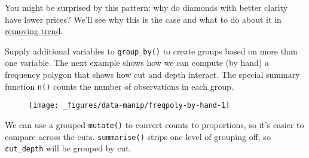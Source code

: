 You might be surprised by this pattern: why do diamonds with better
clarity have lower prices? We'll see why this is the case and what to do
about it in \protect\hyperlink{sub:trend}{removing trend}.

Supply additional variables to \texttt{group\_by()} to create groups
based on more than one variable. The next example shows how we can
compute (by hand) a frequency polygon that shows how cut and depth
interact. The special summary function \texttt{n()} counts the number of
observations in each group.

\begin{Shaded}
\begin{Highlighting}[]
\StringTok{ }\NormalTok{(} \NormalTok{())}
\StringTok{ }\StringTok{ }\StringTok{ }\NormalTok{)}
\CommentTok{#> }

 \StringTok{ }
\StringTok{  }\NormalTok{()}
\end{Highlighting}
\end{Shaded}

\begin{figure}[H]
  \centering
  \texttt{[image: \_figures/data-manip/freqpoly-by-hand-1]}
\end{figure}

We can use a grouped \texttt{mutate()} to convert counts to proportions,
so it's easier to compare across the cuts. \texttt{summarise()} strips
one level of grouping off, so \texttt{cut\_depth} will be grouped by
cut.

\begin{Shaded}
\begin{Highlighting}[]
\StringTok{ } \StringTok{ }
 \StringTok{ }
\StringTok{  }\NormalTok{()}
\end{Highlighting}
\end{Shaded}

